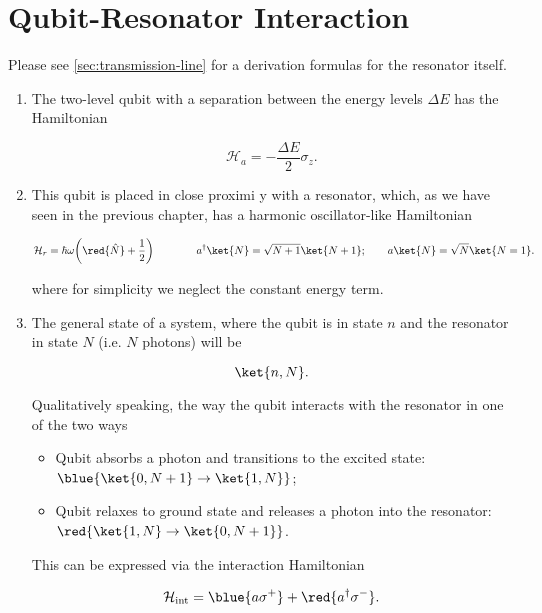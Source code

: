 
\newpage
\section{Qubit-Resonator Interaction \cite{Blais_2004}}

\begin{framed}\noindent
  Please see  \autoref{sec:transmission-line} for  a derivation formulas  for the
  resonator itself.
\end{framed}

\begin{enumerate}
\item  The  two-level   qubit  with  a  separation  between   the  energy  levels
  $ \Delta E $ has the Hamiltonian

\begin{equation}
  \mathcal{H}_{a}= -\frac{\Delta E}{2}\sigma_z.
  \label{qrA}
\end{equation}

\item This qubit is placed in close proximi y with a resonator, which, as we have
  seen in the previous chapter, has a harmonic oscillator-like Hamiltonian

\begin{equation}
  \mathcal{H}_{r}={\hbar\omega}\bigg(\red{\hat{N}}+\frac{1}{2}\bigg)\qquad \qquad a^{\dagger}\ket{N}=\sqrt{N+1}\ket{N+1}; \qquad a\ket{N}=\sqrt{N}\ket{N=1}.
  \label{qrR}
\end{equation}

\noindent where for simplicity we neglect the constant energy term.

\item The general  state of a system, where the  qubit is in state $ n  $ and the
  resonator in state $ N $ (i.e.  $ N $ photons) will be

\begin{equation}
  \ket{n,N}.
\end{equation}

\noindent Qualitatively speaking, the way  the qubit interacts with the resonator
in one of the two ways

\begin{itemize}
\item   Qubit  absorbs   a  photon   and  transitions   to  the   excited  state:
  $ \blue{\ket{0,N+1} \rightarrow \ket{1,N}} $;
\item Qubit  relaxes to ground  state and releases  a photon into  the resonator:
  $ \red{\ket{1,N} \rightarrow \ket{0,N+1}} $.
\end{itemize}

This can be expressed via the interaction Hamiltonian

\begin{equation}
  \mathcal{H}_{\text{int}}=\blue{a\sigma^+}+\red{a^{\dagger}\sigma^-}.
  \label{qrInt}
\end{equation}
\end{enumerate}
